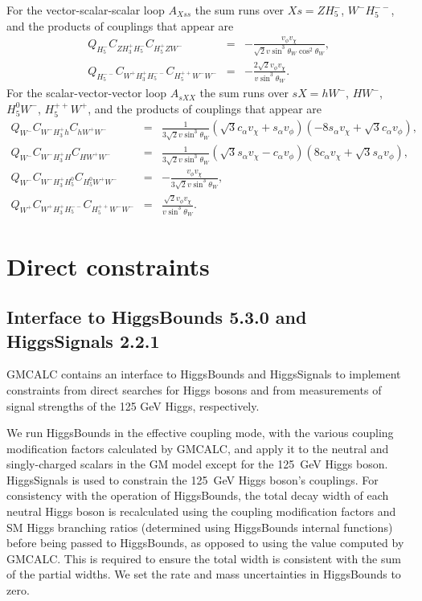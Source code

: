 \documentclass[11pt]{article}
\begin{document}
For the vector-scalar-scalar loop $A_{Xss}$ the sum runs over $Xs = Z H_5^-$, $W^- H_5^{--}$, and the products of couplings that appear are
\begin{eqnarray}
	Q_{H_5^-} C_{ZH_3^+H_5^-} C_{H_5^+Z W^-} &=& - \frac{v_{\phi} v_{\chi}}{\sqrt{2} v \sin^3\theta_W \cos^2\theta_W}, \\
	Q_{H_5^{--}} C_{W^+H_3^+H_5^{--}} C_{H_5^{++} W^- W^-} &=& - \frac{2 \sqrt{2} v_{\phi} v_{\chi}}{v \sin^3\theta_W}.
\end{eqnarray}
For the scalar-vector-vector loop $A_{sXX}$ the sum runs over $sX = hW^-$, $HW^-$, $H_5^0W^-$, $H_5^{++} W^+$, and the products of couplings that appear are
\begin{eqnarray}
	Q_{W^-} C_{W^- H_3^+ h} C_{h W^+ W^-} &=& \frac{1}{3 \sqrt{2} v \sin^3\theta_W} 
	(\sqrt{3} c_{\alpha} v_{\chi} + s_{\alpha} v_{\phi}) 
	(- 8 s_{\alpha} v_{\chi} + \sqrt{3} c_{\alpha} v_{\phi}), \\
	Q_{W^-} C_{W^- H_3^+ H} C_{H W^+ W^-} &=& \frac{1}{3 \sqrt{2} v \sin^3\theta_W}
	(\sqrt{3} s_{\alpha} v_{\chi} - c_{\alpha} v_{\phi})
	(8 c_{\alpha} v_{\chi} + \sqrt{3} s_{\alpha} v_{\phi}), \\
	Q_{W^-} C_{W^- H_3^+ H_5^0} C_{H_5^0 W^+ W^-} &=& - \frac{v_{\phi} v_{\chi}}{3 \sqrt{2} v \sin^3\theta_W}, \\
	Q_{W^+} C_{W^+ H_3^+ H_5^{--}} C_{H_5^{++} W^- W^-} &=& \frac{\sqrt{2} v_{\phi} v_{\chi}}{v \sin^3\theta_W}.
\end{eqnarray}


\section{Direct constraints}
\label{sec:direct}

\subsection{Interface to HiggsBounds 5.3.0 and HiggsSignals 2.2.1}

GMCALC contains an interface to HiggsBounds and HiggsSignals to implement constraints from direct searches for Higgs bosons and from measurements of signal strengths of the 125 GeV Higgs, respectively. 

We run HiggsBounds in the effective coupling mode, with the various coupling modification factors calculated by GMCALC, and apply it to the neutral and singly-charged scalars in the GM model except for the 125~GeV Higgs boson.  HiggsSignals is used to constrain the 125~GeV Higgs boson's couplings.  For consistency with the operation of HiggsBounds, the total decay width of each neutral Higgs boson is recalculated using the coupling modification factors and SM Higgs branching ratios (determined using HiggsBounds internal functions) before being passed to HiggsBounds, as opposed to using the value computed by GMCALC.  This is required to ensure the total width is consistent with the sum of the partial widths.  We set the rate and mass uncertainties in HiggsBounds to zero. 
\end{document}
